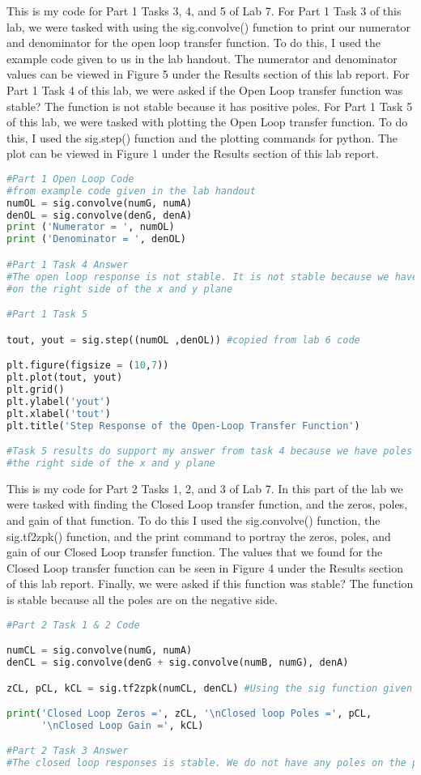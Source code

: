 \documentclass[12pt]{report}
\begin{document}
{This is my code for Part 1 Tasks 3, 4, and 5 of Lab 7. For Part 1 Task 3 of this lab, we were tasked with using the sig.convolve() function to print our numerator and denominator for the open loop transfer function. To do this, I used the example code given to us in the lab handout. The numerator and denominator values can be viewed in Figure 5 under the Results section of this lab report. For Part 1 Task 4 of this lab, we were asked if the Open Loop transfer function was stable? The function is not stable because it has positive poles. For Part 1 Task 5 of this lab, we were tasked with plotting the Open Loop transfer function. To do this, I used the sig.step() function and the plotting commands for python. The plot can be viewed in Figure 1 under the Results section of this lab report. }
\begin{lstlisting}[language=Python]
#Part 1 Open Loop Code
#from example code given in the lab handout
numOL = sig.convolve(numG, numA)
denOL = sig.convolve(denG, denA)
print ('Numerator = ', numOL)
print ('Denominator = ', denOL)

#Part 1 Task 4 Answer
#The open loop response is not stable. It is not stable because we have poles
#on the right side of the x and y plane

#Part 1 Task 5

tout, yout = sig.step((numOL ,denOL)) #copied from lab 6 code

plt.figure(figsize = (10,7))
plt.plot(tout, yout)
plt.grid()
plt.ylabel('yout')
plt.xlabel('tout')
plt.title('Step Response of the Open-Loop Transfer Function')

#Task 5 results do support my answer from task 4 because we have poles on
#the right side of the x and y plane
\end{lstlisting}


{This is my code for Part 2 Tasks 1, 2, and 3 of Lab 7. In this part of the lab we were tasked with  finding the Closed Loop transfer function, and the zeros, poles, and gain of that function. To do this I used the sig.convolve() function, the sig.tf2zpk() function, and the print command to portray the zeros, poles, and gain of our Closed Loop transfer function. The values that we found for the Closed Loop transfer function can be seen in Figure 4 under the Results section of this lab report. Finally, we were asked if this function was stable? The function is stable because all the poles are on the negative side.}
\begin{lstlisting}[language=Python]
#Part 2 Task 1 & 2 Code

numCL = sig.convolve(numG, numA)
denCL = sig.convolve(denG + sig.convolve(numB, numG), denA)

zCL, pCL, kCL = sig.tf2zpk(numCL, denCL) #Using the sig function given in the handout

print('Closed Loop Zeros =', zCL, '\nClosed loop Poles =', pCL, 
      '\nClosed Loop Gain =', kCL)

#Part 2 Task 3 Answer
#The closed loop responses is stable. We do not have any poles on the positive side.
\end{lstlisting}
\end{document}
